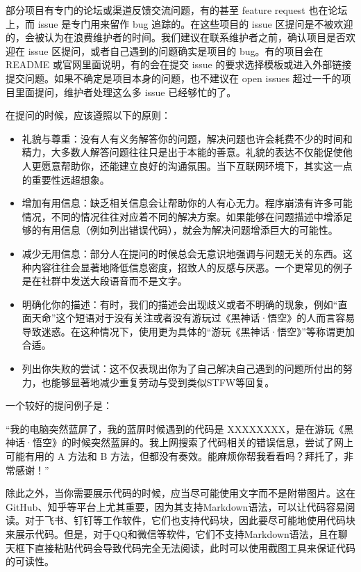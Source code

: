 部分项目有专门的论坛或渠道反馈交流问题，有的甚至 feature request 也在论坛上，而 issue 是专门用来留作 bug 追踪的。在这些项目的 issue 区提问是不被欢迎的，会被认为在浪费维护者的时间。我们建议在联系维护者之前，确认项目是否欢迎在 issue 区提问，或者自己遇到的问题确实是项目的 bug。有的项目会在 README 或官网里面说明，有的会在提交 issue 的要求选择模板或进入外部链接提交问题。如果不确定是项目本身的问题，也不建议在 open issues 超过一千的项目里面提问，维护者处理这么多 issue 已经够忙的了。

在提问的时候，应该遵照以下的原则：

\begin{itemize}
  \item 礼貌与尊重：没有人有义务解答你的问题，解决问题也许会耗费不少的时间和精力，大多数人解答问题往往只是出于本能的善意。礼貌的表达不仅能促使他人更愿意帮助你，还能建立良好的沟通氛围。当下互联网环境下，其实这一点的重要性远超想象。
  \item 增加有用信息：缺乏相关信息会让帮助你的人有心无力。程序崩溃有许多可能情况，不同的情况往往对应着不同的解决方案。如果能够在问题描述中增添足够的有用信息（例如列出错误代码），就会为解决问题增添巨大的可能性。
  \item 减少无用信息：部分人在提问的时候总会无意识地强调与问题无关的东西。这种内容往往会显著地降低信息密度，招致人的反感与厌恶。一个更常见的例子是在社群中发送大段语音而不是文字。
  \item 明确化你的描述：有时，我们的描述会出现歧义或者不明确的现象，例如“直面天命”这个短语对于没有关注或者没有游玩过《黑神话·悟空》的人而言容易导致迷惑。在这种情况下，使用更为具体的“游玩《黑神话·悟空》”等称谓更加合适。
  \item 列出你失败的尝试：这不仅表现出你为了自己解决自己遇到的问题所付出的努力，也能够显著地减少重复劳动与受到类似STFW等回复。
\end{itemize}

一个较好的提问例子是：

“我的电脑突然蓝屏了，我的蓝屏时候遇到的代码是 XXXXXXXX，是在游玩《黑神话·悟空》的时候突然蓝屏的。我上网搜索了代码相关的错误信息，尝试了网上可能有用的 A 方法和 B 方法，但都没有奏效。能麻烦你帮我看看吗？拜托了，非常感谢！”

除此之外，当你需要展示代码的时候，应当尽可能使用文字而不是附带图片。这在GitHub、知乎等平台上尤其重要，因为其支持Markdown语法，可以让代码容易阅读。对于飞书、钉钉等工作软件，它们也支持代码块，因此要尽可能地使用代码块来展示代码。但是，对于QQ和微信等软件，它们不支持Markdown语法，且在聊天框下直接粘贴代码会导致代码完全无法阅读，此时可以使用截图工具来保证代码的可读性。

